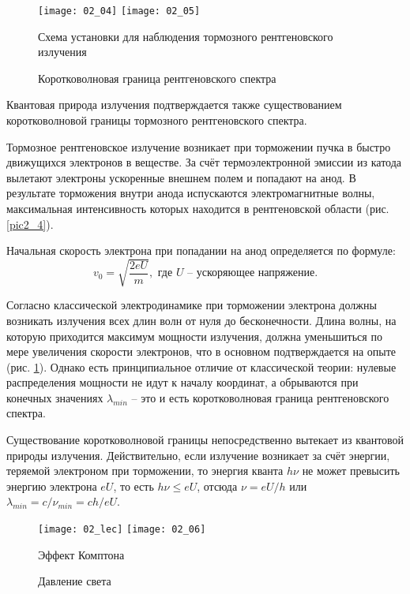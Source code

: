 \begin{figure}[h!]
    \center
    \texttt{[image: 02\_04]} \hfill
    \texttt{[image: 02\_05]}
    \parbox{.64\textwidth}{\caption{Схема установки для наблюдения тормозного
    рентгеновского излучения}\label{pic2_4}} \hfill
    \parbox{.32\textwidth}{\caption{Коротковолновая граница рентгеновского
    спектра}\label{pic2_5}}
\end{figure}

Квантовая природа излучения подтверждается также существованием коротковолновой
границы тормозного рентгеновского спектра.

Тормозное рентгеновское излучение возникает при торможении пучка в быстро
движущихся электронов в веществе. За счёт термоэлектронной эмиссии из катода
вылетают электроны ускоренные внешнем полем и попадают на анод. В результате
торможения внутри анода испускаются электромагнитные волны, максимальная
интенсивность которых находится в рентгеновской области (рис. \ref{pic2_4}).

Начальная скорость электрона при попадании на анод определяется по формуле:
\[
    v_0 = \sqrt{\frac{2eU}{m}}, \text{ где } U \text{ -- ускоряющее напряжение}.
\]

Согласно классической электродинамике при торможении электрона должны возникать
излучения всех длин волн от нуля до бесконечности. Длина волны, на которую
приходится максимум мощности излучения, должна уменьшиться по мере увеличения
скорости электронов, что в основном подтверждается на опыте (рис. \ref{pic2_5}).
Однако есть принципиальное отличие от классической теории: нулевые распределения
мощности не идут к началу координат, а обрываются при конечных значениях
\( \lambda_{min} \) -- это и есть коротковолновая граница рентгеновского
спектра.

Существование коротковолновой границы непосредственно вытекает из квантовой
природы излучения. Действительно, если излучение возникает за счёт энергии,
теряемой электроном при торможении, то энергия кванта \( h\nu \) не может
превысить энергию электрона \( eU \), то есть \( h\nu \le eU \), отсюда
\( \nu = eU/h \) или \( \lambda_{min} = c/\nu_{min} = ch/eU \).

\begin{figure}[h!]
    \center
    \texttt{[image: 02\_lec]} \hfill
    \texttt{[image: 02\_06]}
    \parbox{.58\textwidth}{\caption{Эффект Комптона}\label{pic2_lec}} \hfill
    \parbox{.35\textwidth}{\caption{Давление света}\label{pic2_6}}
\end{figure}

